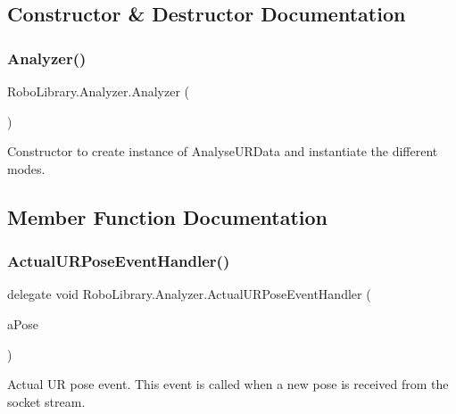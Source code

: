 \subsection{Constructor \& Destructor Documentation}
\hypertarget{class_robo_library_1_1_analyzer_a2a0c69716b9a8467c56dc8fafcb2fa16}{}\label{class_robo_library_1_1_analyzer_a2a0c69716b9a8467c56dc8fafcb2fa16} 
\subsubsection{\texorpdfstring{Analyzer()}{Analyzer()}}
{\footnotesize\ttfamily Robo\+Library.\+Analyzer.\+Analyzer (\begin{DoxyParamCaption}{ }\end{DoxyParamCaption})}



Constructor to create instance of Analyse\+U\+R\+Data and instantiate the different modes.



\subsection{Member Function Documentation}
\hypertarget{class_robo_library_1_1_analyzer_a232f56c61a30de1de9e27021bf5dc77b}{}\label{class_robo_library_1_1_analyzer_a232f56c61a30de1de9e27021bf5dc77b} 
\subsubsection{\texorpdfstring{Actual\+U\+R\+Pose\+Event\+Handler()}{ActualURPoseEventHandler()}}
{\footnotesize\ttfamily delegate void Robo\+Library.\+Analyzer.\+Actual\+U\+R\+Pose\+Event\+Handler (\begin{DoxyParamCaption}\item[{\hyperlink{class_robo_library_1_1_u_r_pose}{U\+R\+Pose}}]{a\+Pose }\end{DoxyParamCaption})}



Actual UR pose event. This event is called when a new pose is received from the socket stream.

